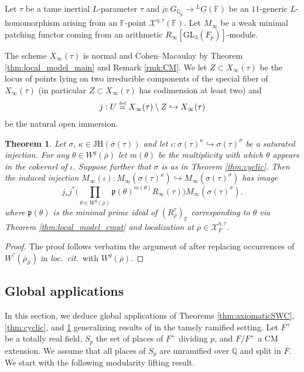 \documentclass[oneside,a4paper,english, 11pt]{amsart}
\theoremstyle{plain}
\newtheorem{thm}{Theorem}[subsection]
\theoremstyle{plain}
\theoremstyle{plain}
\theoremstyle{plain}
\theoremstyle{plain}
\theoremstyle{plain}
\theoremstyle{definition}
\theoremstyle{definition}
\theoremstyle{definition}
\theoremstyle{remark}
\numberwithin{equation}{section}
\newcommand{\Q}{\mathbb{Q}}
\newcommand{\Qp}{\mathbb{Q}_p}
\newcommand{\F}{\mathbb{F}}
\newcommand{\cS}{\mathcal{S}}
\newcommand{\cX}{\mathcal{X}}
\newcommand{\GL}{\mathrm{GL}}
\newcommand{\un}[1]{\underline{#1}}
\newcommand{\JH}{\mathrm{JH}}
\newcommand{\rhobar}{\overline{\rho}}
\newcommand{\defeq}{\stackrel{\textrm{\tiny{def}}}{=}}
\newcommand{\ovl}[1]{\overline{#1}}
\newcommand{\ra}{\rightarrow}
\newcommand{\into}{\hookrightarrow}
\begin{document}
%

%
Let $\tau$ be a tame inertial $L$-parameter $\tau$ and $\rhobar:G_{\Qp}\ra{}^L\un{G}(\F)$ be an $11$-generic $L$-homomorphism arising from an $\F$-point $\cX^{\eta,\tau}(\F)$. 
Let $M_\infty$ be a weak minimal patching functor coming from an arithmetic $R_\infty[\GL_3(F_p)]$-module. 

The scheme $X_\infty(\tau)$ is normal and Cohen--Macaulay by Theorem \ref{thm:local_model_main} and Remark \ref{rmk:CM}.
We let $Z \subset X_{\infty}(\tau)$ be the locus of points lying on two irreducible components of the special fiber of $X_{\infty}(\tau)$ (in particular $Z\subset X_{\infty}(\tau)$ has codimension at least two) and
\begin{equation*}
j: U \defeq X_{\infty}(\tau) \setminus Z \into X_{\infty}(\tau)
\end{equation*}
be the natural open immersion.

%
%
%
%
%
%
%
%
%

%
%
%
%
%
%
%
%

\begin{thm}\label{thm:gauge}
Let $\sigma,\,\kappa\in \JH(\ovl{\sigma}(\tau))$ and let $\iota: \sigma(\tau)^\kappa \into \sigma(\tau)^\sigma$ be a saturated injection.
For any $\theta \in W^g(\rhobar)$ let $m(\theta)$ be the multiplicity with which $\theta$ appears in the cokernel of $\iota$.
Suppose further that $\sigma$ is as in Theorem \ref{thm:cyclic}.
Then the induced injection $M_\infty(\iota):  M_\infty(\sigma(\tau)^\kappa) \into M_\infty(\sigma(\tau)^\sigma)$ has image 
\[j_*j^* \Big(\prod_{\theta\in W^g(\rhobar)} \mathfrak{p}(\theta)^{m(\theta)}R_\infty(\tau)\Big) M_\infty(\sigma(\tau)^\sigma).\]
where $\mathfrak{p}(\theta)$ is the minimal prime ideal of $(R_{\rhobar}^{\tau})_{\F}$ corresponding to $\theta$ via Theorem \ref{thm:local_model_cmpt} and localization at $\rhobar\in \cX_F^{\eta,\tau}$.
%
%
%
%
%
\end{thm}
\begin{proof}
The proof follows verbatim the argument of \cite[Lemmas 5.2.1 and 5.2.2, Theorem 5.2.3]{LLLM2} after replacing occurrences of $W^{?}(\rhobar_{\cS})$ in \emph{loc.~cit.}~with $W^g(\rhobar)$.
\end{proof}


\subsection{Global applications}
\label{subsec:global}

In this section, we deduce global applications of Theorems \ref{thm:axiomaticSWC}, \ref{thm:cyclic}, and \ref{thm:gauge} generalizing results of \cite[\S 5.3]{LLLM2} in the tamely ramified setting. 
%
%
%
%
%
%
Let $F^+$ be a totally real field, $S_p$ the set of places of $F^+$ dividing $p$, and $F/F^+$ a CM extension. 
We assume that all places of $S_p$ are unramified over $\Q$ and split in $F$.
We start with the following modularity lifting result. 
\end{document}

